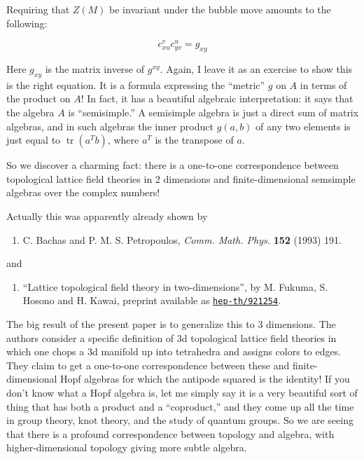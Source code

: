 \documentclass{article}
\def\tightlist{}
\begin{document}
Requiring that \(Z(M)\) be invariant under the bubble move amounts to
the following:

\[c_{xu}^v c_{yv}^u = g_{xy}\]

Here \(g_{xy}\) is the matrix inverse of \(g^{xy}\). Again, I leave it
as an exercise to show this is the right equation. It is a formula
expressing the ``metric'' \(g\) on \(A\) in terms of the product on
\(A\)! In fact, it has a beautiful algebraic interpretation: it says
that the algebra \(A\) is ``semisimple.'' A semisimple algebra is just a
direct sum of matrix algebras, and in such algebras the inner product
\(g(a,b)\) of any two elements is just equal to
\(\operatorname{tr}(a^T b)\), where \(a^T\) is the transpose of \(a\).

So we discover a charming fact: there is a one-to-one correspondence
between topological lattice field theories in 2 dimensions and
finite-dimensional semsimple algebras over the complex numbers!

Actually this was apparently already shown by

\begin{enumerate}
\def\labelenumi{\arabic{enumi})}
\setcounter{enumi}{1}
\tightlist
\item
  C. Bachas and P. M. S. Petropoulos, \emph{Comm. Math. Phys.}
  \textbf{152} (1993) 191.
\end{enumerate}

and

\begin{enumerate}
\def\labelenumi{\arabic{enumi})}
\setcounter{enumi}{2}
\tightlist
\item
  ``Lattice topological field theory in two-dimensions'', by M. Fukuma,
  S. Hosono and H. Kawai, preprint available as
  \href{http://xxx.lanl.gov/abs/hep-th/921254}{\texttt{hep-th/921254}}.
\end{enumerate}

The big result of the present paper is to generalize this to 3
dimensions. The authors consider a specific definition of 3d topological
lattice field theories in which one chops a 3d manifold up into
tetrahedra and assigns colors to edges. They claim to get a one-to-one
correspondence between these and finite-dimensional Hopf algebras for
which the antipode squared is the identity! If you don't know what a
Hopf algebra is, let me simply say it is a very beautiful sort of thing
that has both a product and a ``coproduct,'' and they come up all the
time in group theory, knot theory, and the study of quantum groups. So
we are seeing that there is a profound correspondence between topology
and algebra, with higher-dimensional topology giving more subtle
algebra.
\end{document}
